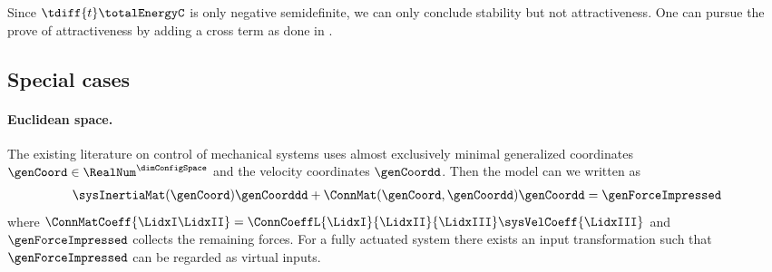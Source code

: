 Since $\tdiff{t} \totalEnergyC$ is only negative semidefinite, we can only conclude stability but not attractiveness.
One can pursue the prove of attractiveness by adding a cross term as done in \cite{Bullo:TrackingAutomatica}.


\subsection{Special cases}\label{sec:ComputedTorque}
\paragraph{Euclidean space.}
The existing literature on control of mechanical systems uses almost exclusively minimal generalized coordinates $\genCoord \in \RealNum^\dimConfigSpace$ and the velocity coordinates $\genCoordd$.
Then the model can we written as
\begin{align}
 \sysInertiaMat(\genCoord) \genCoorddd + \ConnMat(\genCoord, \genCoordd) \genCoordd = \genForceImpressed 
\end{align}
where $\ConnMatCoeff{\LidxI\LidxII} = \ConnCoeffL{\LidxI}{\LidxII}{\LidxIII}\sysVelCoeff{\LidxIII}$ and $\genForceImpressed$ collects the remaining forces.
For a fully actuated system there exists an input transformation such that $\genForceImpressed$ can be regarded as virtual inputs.

